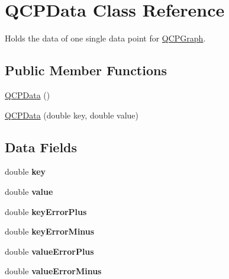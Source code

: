 \hypertarget{classQCPData}{\section{Q\-C\-P\-Data Class Reference}
\label{classQCPData}
}


Holds the data of one single data point for \hyperlink{classQCPGraph}{Q\-C\-P\-Graph}.  


\subsection*{Public Member Functions}
\begin{DoxyCompactItemize}
\item 
\hyperlink{classQCPData_a1f06d624e36ba0ed72ac36d42aa5c7ee}{Q\-C\-P\-Data} ()
\item 
\hyperlink{classQCPData_aa274181ae8de2a0907ba5464d3c2c103}{Q\-C\-P\-Data} (double key, double value)
\end{DoxyCompactItemize}
\subsection*{Data Fields}
\begin{DoxyCompactItemize}
\item 
\hypertarget{classQCPData_a2f5ba9aca61bb74f88516e148a4cf71b}{double {\bfseries key}}\label{classQCPData_a2f5ba9aca61bb74f88516e148a4cf71b}

\item 
\hypertarget{classQCPData_aefe1ecf8fa2e34ed875b67523e542373}{double {\bfseries value}}\label{classQCPData_aefe1ecf8fa2e34ed875b67523e542373}

\item 
\hypertarget{classQCPData_ae468c3808107c2fd23052481156ab5b5}{double {\bfseries key\-Error\-Plus}}\label{classQCPData_ae468c3808107c2fd23052481156ab5b5}

\item 
\hypertarget{classQCPData_af107d650b8ee5c3b2961ecddcfb1bccb}{double {\bfseries key\-Error\-Minus}}\label{classQCPData_af107d650b8ee5c3b2961ecddcfb1bccb}

\item 
\hypertarget{classQCPData_ad26912552d03485ea20d91dcad16aa8f}{double {\bfseries value\-Error\-Plus}}\label{classQCPData_ad26912552d03485ea20d91dcad16aa8f}

\item 
\hypertarget{classQCPData_a51d8f42bf4d49a1f263531e70cadd6a3}{double {\bfseries value\-Error\-Minus}}\label{classQCPData_a51d8f42bf4d49a1f263531e70cadd6a3}

\end{DoxyCompactItemize}


